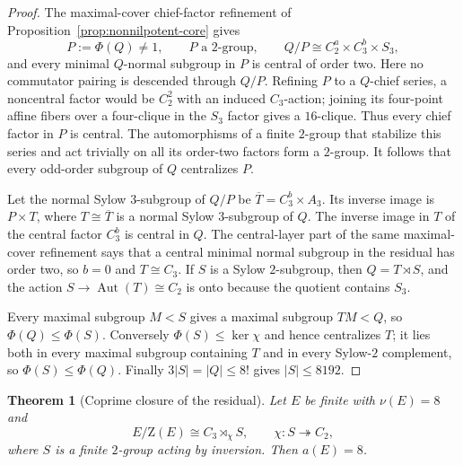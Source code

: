 \documentclass[11pt]{article}
\newtheorem{theorem}{Theorem}[section]
\theoremstyle{remark}
\newcommand{\nuG}{\nu}
\newcommand{\aG}{a}
\newcommand{\Z}{\mathrm Z}
\begin{document}
\begin{proof}
The maximal-cover chief-factor refinement of
Proposition~\ref{prop:nonnilpotent-core} gives
\[
 P:=\Phi(Q)\ne1,\qquad P\text{ a $2$-group},\qquad
 Q/P\cong C_2^a\times C_3^b\times S_3,
\]
and every minimal $Q$-normal subgroup in $P$ is central of order two.
Here no commutator pairing is descended through $Q/P$.  Refining $P$ to a
$Q$-chief series, a noncentral factor would be $C_2^2$ with an induced
$C_3$-action; joining its four-point affine fibers over a four-clique in
the $S_3$ factor gives a $16$-clique.  Thus every chief factor in $P$ is
central.  The automorphisms of a finite $2$-group that stabilize this
series and act trivially on all its order-two factors form a $2$-group.
It follows that every odd-order subgroup of $Q$ centralizes $P$.

Let the normal Sylow $3$-subgroup of $Q/P$ be
$\overline T=C_3^b\times A_3$.  Its inverse image is $P\times T$, where
$T\cong\overline T$ is a normal Sylow $3$-subgroup of $Q$.  The inverse
image in $T$ of the central factor $C_3^b$ is central in $Q$.  The
central-layer part of the same maximal-cover refinement says that a central
minimal normal subgroup in the residual has order two, so $b=0$ and
$T\cong C_3$.  If $S$ is a Sylow $2$-subgroup, then $Q=T\rtimes S$, and
the action $S\to\operatorname{Aut}(T)\cong C_2$ is onto because the quotient
contains $S_3$.

Every maximal subgroup $M<S$ gives a maximal subgroup $TM<Q$, so
$\Phi(Q)\le\Phi(S)$.  Conversely $\Phi(S)\le\ker\chi$ and hence centralizes
$T$; it lies both in every maximal subgroup containing $T$ and in every
Sylow-$2$ complement, so $\Phi(S)\le\Phi(Q)$.  Finally
$3|S|=|Q|\le8!$ gives $|S|\le8192$.
\end{proof}

\begin{theorem}[Coprime closure of the residual]
\label{thm:nonnilpotent-coprime-closure}
Let $E$ be finite with $\nuG(E)=8$ and
\[
 E/\Z(E)\cong C_3\rtimes_\chi S,\qquad
 \chi:S\twoheadrightarrow C_2,
\]
where $S$ is a finite $2$-group acting by inversion.  Then $\aG(E)=8$.
\end{theorem}
\end{document}
